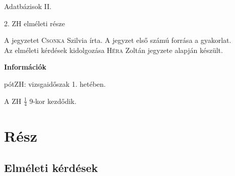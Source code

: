 \documentclass[a4paper,11.5pt, table]{article}
\begin{document}
	\begin{center}
		{\LARGE Adatbázisok II.}
		\smallskip
		
		{\large 2. ZH elméleti része}
	\end{center}
	A jegyzetet \textsc{Csonka} Szilvia írta. A jegyzet első számú forrása a gyakorlat.\\
	Az elméleti kérdések kidolgozása \textsc{Héra} Zoltán jegyzete alapján készült.
	
	
	
	
	
{\large \textbf{Információk}}
	\begin{compactitem}
		\item pótZH: vizsgaidőszak 1. hetében.
		\item A ZH $\frac{1}{4}$ 9-kor kezdődik.
	\end{compactitem}
	
\section{Rész}

\subsection{Elméleti kérdések}
\end{document}
